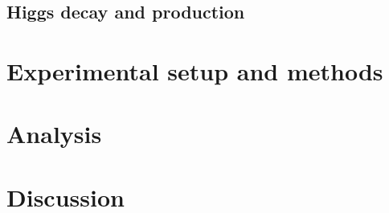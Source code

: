 \documentclass[twoside,        %
               BCOR12mm,       %
               ngerman,english, %
               fleqn,headsepline=false,footsepline=false
              ]{Vorlage/MFPREPORT}
\begin{document}
\subsection{Higgs decay and production}





\section{Experimental setup and methods}
\label{sec:setup}

\section{Analysis}
\label{sec:analysis}

\section{Discussion}
\label{sec:discussion}



\newpage

\begin{appendices}
\end{appendices}
\end{document}
